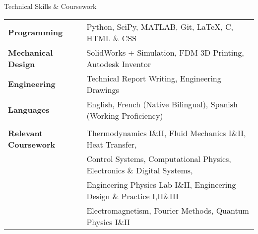 \documentclass{resume} %
\begin{document}

\begin{rSection}{Technical Skills \& Coursework}
\begin{tabular}{ @{} >{\bfseries}l @{\hspace{6ex}} l }

Programming & Python, SciPy, MATLAB, Git, \LaTeX, C, HTML \& CSS \\
Mechanical Design & SolidWorks + Simulation, FDM 3D Printing, Autodesk Inventor\\
Engineering & Technical Report Writing, Engineering Drawings \\
Languages &  English, French (Native Bilingual), Spanish (Working Proficiency)\\
\\
Relevant Coursework & Thermodynamics I\&II, Fluid Mechanics I\&II, Heat Transfer,\\& Control Systems, Computational Physics, Electronics \& Digital Systems,\\&Engineering Physics Lab I\&II, Engineering Design \& Practice I,II\&III \\&Electromagnetism, Fourier Methods, Quantum Physics I\&II\\

\end{tabular}
\end{rSection}



\end{document}
